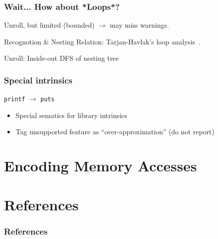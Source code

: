 \documentclass[aspectratio=169]{ctexbeamer}
\begin{document}
\begin{frame}
    \frametitle{Wait... How about *Loops*?}

    Unroll, but limited (bounded) $\rightarrow$ may miss warnings.

    Recognotion \& Nesting Relation: Tarjan-Havlak's loop analysis~\cite{Havlak1997NestingOR}.

    Unroll: Inside-out DFS of nesting tree

\end{frame}


\begin{frame}
    \frametitle{Special intrinsics}
    \begin{center}
        \texttt{printf} $\rightarrow$ \texttt{puts}
    \end{center}

    \begin{itemize}
        \pause
        \item Special sematics for library intrinsics
              \pause
        \item Tag unsupported feature as ``over-approximation'' (do not report)
    \end{itemize}

\end{frame}


\section{Encoding Memory Accesses}

\section{References}


\begin{frame}[allowframebreaks]
    \frametitle{References}
    
    
\end{frame}
\end{document}
